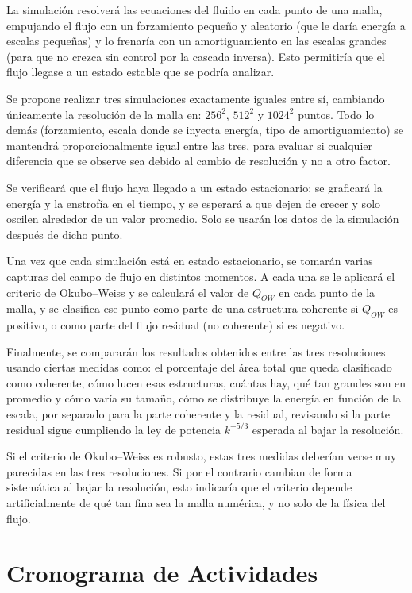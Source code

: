 La simulación resolverá las ecuaciones del fluido en cada punto de una malla, empujando el flujo con 
un forzamiento pequeño y aleatorio (que le daría energía a escalas pequeñas) y lo frenaría con un amortiguamiento 
en las escalas grandes (para que no crezca sin control por la cascada inversa). 
Esto permitiría que el flujo llegase a un estado estable que se podría analizar.

Se propone realizar tres simulaciones exactamente iguales entre sí, cambiando únicamente la resolución de la malla en: $256^2$, $512^2$ y $1024^2$ puntos. 
Todo lo demás (forzamiento, escala donde se inyecta energía, tipo de amortiguamiento) 
se mantendrá proporcionalmente igual entre las tres, para evaluar si cualquier diferencia que se observe 
sea debido al cambio de resolución y no a otro factor.

Se verificará que el flujo haya llegado a un estado estacionario: 
se graficará la energía y la enstrofía en el tiempo, y se esperará a que dejen de crecer y solo oscilen alrededor 
de un valor promedio. Solo se usarán los datos de la simulación después de dicho punto.

Una vez que cada simulación está en estado estacionario, se tomarán varias capturas del campo de flujo en distintos momentos. 
A cada una se le aplicará el criterio de Okubo--Weiss y se calculará el valor de $Q_{OW}$ en cada punto de la malla, 
y se clasifica ese punto como parte de una estructura coherente si $Q_{OW}$ es positivo, o como parte del flujo residual 
(no coherente) si es negativo.

Finalmente, se compararán los resultados obtenidos entre las tres resoluciones usando ciertas medidas como:
el porcentaje del área total que queda clasificado como coherente, cómo lucen esas estructuras, cuántas hay, 
qué tan grandes son en promedio y cómo varía su tamaño, cómo se distribuye la energía en función de 
la escala, por separado para la parte coherente y la residual, revisando si la parte residual sigue cumpliendo 
la ley de potencia $k^{-5/3}$ esperada al bajar la resolución.

Si el criterio de Okubo--Weiss es robusto, estas tres medidas deberían verse muy parecidas en las tres resoluciones. 
Si por el contrario cambian de forma sistemática al bajar la resolución, esto indicaría que el criterio depende artificialmente 
de qué tan fina sea la malla numérica, y no solo de la física del flujo.

\section{Cronograma de Actividades}

